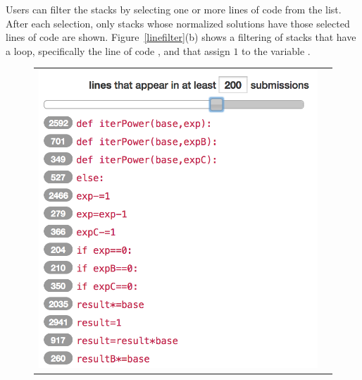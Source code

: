 Users can filter the stacks by selecting one or more lines of code from the list. After each selection, only stacks whose normalized solutions have those selected lines of code are shown. Figure~\ref{linefilter}(b) shows a filtering of stacks that have a  loop, specifically the line of code , and that assign $1$ to the variable .

\begin{figure}[htpb]
\begin{tabular}{c | c}
\begin{minipage}{.48\linewidth}
\centering
\includegraphics[scale=0.5]{Body/figures/overcode/lineSlider.png}
\end{minipage}
&
\begin{minipage}{.52\linewidth}
\centering

\end{minipage}
\end{tabular}
\end{figure}
